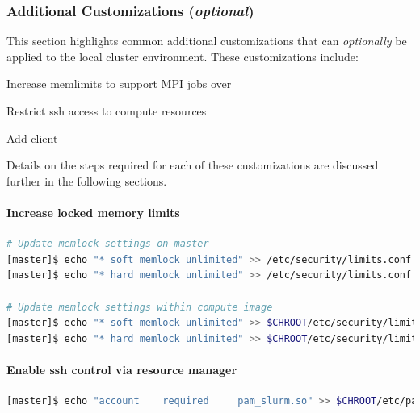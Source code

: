 \documentclass[letterpaper]{article}
\begin{document}
\subsubsection{Additional Customizations ({\em optional})} \label{sec:addl_customizations}

This section highlights common additional customizations that
can {\em optionally} be applied to the
local cluster environment. These customizations include:

\begin{itemize*}
\item Increase memlimits to support MPI jobs over \InfiniBand{}
\item Restrict ssh access to compute resources
\item Add \Lustre{} client
\end{itemize*}

\noindent Details on the steps required for each of these customizations are
discussed further in the following sections.

\paragraph{Increase locked memory limits}

 

\begin{lstlisting}[language=bash,keywords={},upquote=true]
# Update memlock settings on master
[master]$ echo "* soft memlock unlimited" >> /etc/security/limits.conf
[master]$ echo "* hard memlock unlimited" >> /etc/security/limits.conf

# Update memlock settings within compute image
[master]$ echo "* soft memlock unlimited" >> $CHROOT/etc/security/limits.conf
[master]$ echo "* hard memlock unlimited" >> $CHROOT/etc/security/limits.conf
\end{lstlisting}


\paragraph{Enable ssh control via resource manager} 



\begin{lstlisting}[language=bash,keywords={},upquote=true]
[master]$ echo "account    required     pam_slurm.so" >> $CHROOT/etc/pam.d/sshd
\end{lstlisting}
\end{document}
